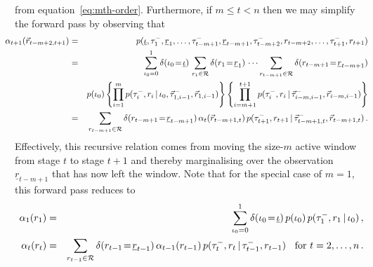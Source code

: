 \documentclass[a4paper]{article}
\newcommand{\ui}{\underline{\iota}}
\newcommand{\ur}{\underline{r}}
\newcommand{\vr}{\vec{r}}
\newcommand{\tm}{\tau^{-}}
\begin{document}
from equation~\eqref{eq:mth-order}. 
Furthermore, if $m\le t<n$ then we may simplify the forward pass by observing that
\begin{eqnarray}
\!\!\!\!\!\!\!
\alpha_{t+1}(\vr_{t-m+2,t+1}) & = & 
p(\ui,\tm_1,\ur_1,\ldots,\tm_{t-m+1},\ur_{t-m+1},\tm_{t-m+2},r_{t-m+2},\ldots,\tm_{t+1},r_{t+1})
\nonumber\\& = &
\sum_{\iota_0=0}^{1}\delta(\iota_0\!=\!\ui)\,
\sum_{r_1\in{\cal R}} \delta(r_1\!=\!\ur_1)\,
\cdots
\sum_{r_{t-m+1}\in{\cal R}} \delta(r_{t-m+1}\!=\!\ur_{t-m+1})
\nonumber\\&&
p(\iota_0)\left\{\prod_{i=1}^{m}p(\tm_i,r_i\,|\,\iota_0,\vec{\tau}^-_{1,i-1},\vr_{1,i-1})\right\}
\left\{\prod_{i=m+1}^{t+1}p(\tm_i,r_i\,|\,\vec{\tau}^-_{i-m,i-1},\vr_{i-m,i-1})\right\}
\nonumber\\& = &\!\!\!
\sum_{r_{t-m+1}\in{\cal R}} \delta(r_{t-m+1}\!=\!\ur_{t-m+1})\,\alpha_t(\vr_{t-m+1,t})
\,p(\tm_{t+1},r_{t+1}\,|\,\vec{\tau}^-_{t-m+1,t},\vr_{t-m+1,t})\,.
\label{eq:fwd-pass-m-recursive}
\end{eqnarray}
Effectively, this recursive relation comes from moving the size-$m$ active window from stage $t$ to stage $t+1$ and thereby marginalising over the
observation $\ur_{t-m+1}$ that has now left the window.
Note that for the special case of $m=1$, this forward pass reduces to
\begin{eqnarray}
\alpha_1(r_1) & = &  \sum_{\iota_0=0}^{1}\delta(\iota_0\!=\!\ui)\,
p(\iota_0)\,p(\tm_1,r_1\,|\,\iota_0)\,,
\nonumber\\
\alpha_{t}(r_{t}) & = &
\sum_{r_{t-1}\in{\cal R}} \delta(r_{t-1}\!=\!\ur_{t-1})\,\alpha_{t-1}(r_{t-1})
\,p(\tm_{t},r_{t}\,|\,\tm_{t-1},r_{t-1})
\hspace*{2mm}\mbox{ for $t=2,\ldots,n$}
\,.
\end{eqnarray}
\end{document}
